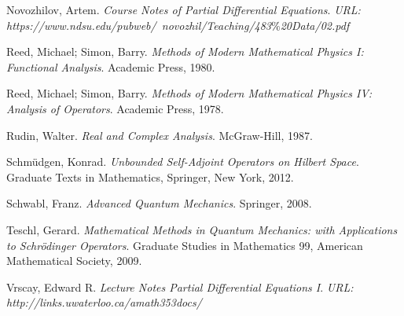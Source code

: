 \documentclass[12pt]{article}
\theoremstyle{definition}
\begin{document}
\begin{thebibliography}{a}
Novozhilov, Artem.
\textit{Course Notes of Partial Differential Equations}.
\textit{URL:
https://www.ndsu.edu/pubweb/~novozhil/Teaching/483$\%$20Data/02.pdf}

Reed, Michael; Simon, Barry.
\textit{Methods of Modern Mathematical Physics I: Functional Analysis}.
Academic Press, 1980.

Reed, Michael; Simon, Barry.
\textit{Methods of Modern Mathematical Physics IV: Analysis of Operators}.
Academic Press, 1978.

Rudin, Walter.
\textit{Real and Complex Analysis}.
McGraw-Hill, 1987.

Schmüdgen, Konrad. 
\textit{Unbounded Self-Adjoint Operators on Hilbert Space}.
Graduate Texts in Mathematics, Springer, New York, 2012.

Schwabl, Franz.
\textit{Advanced Quantum Mechanics}.
Springer, 2008.

Teschl, Gerard.
\textit{Mathematical Methods in Quantum Mechanics: with Applications to Schrödinger Operators}.
Graduate Studies in Mathematics 99, American Mathematical Society, 2009.

Vrscay, Edward R.
\textit{Lecture Notes Partial Differential Equations I}.
\textit{URL:
http://links.uwaterloo.ca/amath353docs/}
\end{thebibliography}
\end{document}
